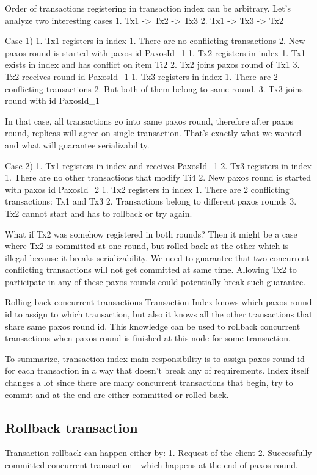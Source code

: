 Order of transactions registering in transaction index can be arbitrary. Let’s analyze two interesting cases
1. Tx1 -> Tx2 -> Tx3
2. Tx1 -> Tx3 -> Tx2


Case 1)
1. Tx1 registers in index
   1. There are no conflicting transactions
   2. New paxos round is started with paxos id PaxosId_1
1. Tx2 registers in index
   1. Tx1 exists in index and has conflict on item Ti2
   2. Tx2 joins paxos round of Tx1 
   3. Tx2 receives round id PaxosId_1
1. Tx3 registers in index
   1. There are 2 conflicting transactions
   2. But both of them belong to same round. 
   3. Tx3 joins round with id PaxosId_1


In that case, all transactions go into same paxos round, therefore after paxos round, replicas will agree on single transaction. That’s exactly what we wanted and what will guarantee serializability.


Case 2)
1. Tx1 registers in index and receives PaxosId_1
2. Tx3 registers in index
   1. There are no other transactions that modify Ti4
   2. New paxos round is started with paxos id PaxosId_2
1. Tx2 registers in index
   1. There are 2 conflicting transactions: Tx1 and Tx3
   2. Transactions belong to different paxos rounds
   3. Tx2 cannot start and has to rollback or try again.


What if Tx2 was somehow registered in both rounds? Then it might be a case where Tx2 is committed at one round, but rolled back at the other which is illegal because it breaks serializability. We need to guarantee that two concurrent conflicting transactions will not get committed at same time. Allowing Tx2 to participate in any of these paxos rounds could potentially break such guarantee.


Rolling back concurrent transactions
Transaction Index knows which paxos round id to assign to which transaction, but also it knows all the other transactions that share same paxos round id. This knowledge can be used to rollback concurrent transactions when paxos round is finished at this node for some transaction.


To summarize, transaction index main responsibility is to assign paxos round id for each transaction in a way that doesn’t break any of requirements. Index itself changes a lot since there are many concurrent transactions that begin, try to commit and at the end are either committed or rolled back. 




\subsection{Rollback transaction}
Transaction rollback can happen either by:
1. Request of the client
2. Successfully committed concurrent transaction - which happens at the end of paxos round.


